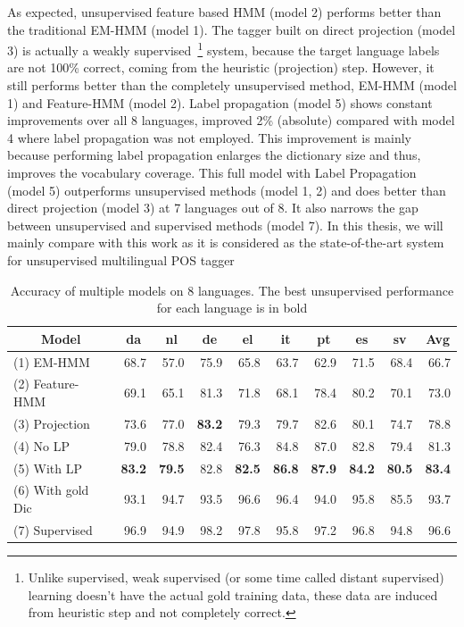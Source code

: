 As expected, unsupervised feature based HMM (model 2) performs better than the traditional EM-HMM (model 1). The tagger built on direct projection (model 3) is actually a weakly supervised~\footnote{Unlike supervised, weak supervised (or some time called distant supervised) learning doesn't have the actual gold training data, these data are induced from heuristic step and not completely correct.} system, because the target language labels are not 100\% correct, coming from the heuristic (projection) step. However, it still performs better than the completely unsupervised method, EM-HMM (model 1) and Feature-HMM (model 2). Label propagation (model 5) shows constant improvements over all 8 languages, improved 2\% (absolute) compared with model 4 where label propagation was not employed. This improvement is mainly because performing label propagation enlarges the dictionary size and thus, improves the vocabulary coverage. This full model with Label Propagation (model 5) outperforms unsupervised methods (model 1, 2) and does better than direct projection (model 3) at 7 languages out of 8. It also narrows the gap between unsupervised and supervised methods (model 7). In this thesis, we will mainly compare with this work as it is considered as the state-of-the-art system for unsupervised multilingual POS tagger

\begin{table}[htbp]
  \centering

    \begin{tabular}{l|rrrrrrrr|r}
    \multicolumn{1}{c}{Model} & \multicolumn{1}{c}{da} & \multicolumn{1}{c}{nl} & \multicolumn{1}{c}{de} & \multicolumn{1}{c}{el} & \multicolumn{1}{c}{it} & \multicolumn{1}{c}{pt} & \multicolumn{1}{c}{es} & \multicolumn{1}{c}{sv} & \multicolumn{1}{c}{Avg} \\\hline

    (1) EM-HMM & 68.7  & 57.0    & 75.9  & 65.8  & 63.7  & 62.9  & 71.5  & 68.4  & 66.7 \\
    (2) Feature-HMM & 69.1  & 65.1  & 81.3  & 71.8  & 68.1  & 78.4  & 80.2  & 70.1  & 73.0 \\
    (3) Projection & 73.6  & 77.0    & \textbf{83.2}  & 79.3  & 79.7  & 82.6  & 80.1  & 74.7  & 78.8 \\\hline
    (4) No LP  & 79.0    & 78.8  & 82.4  & 76.3  & 84.8  & 87.0    & 82.8  & 79.4  & 81.3 \\
    (5) With LP & \textbf{83.2}  &\textbf{ 79.5}  & 82.8  & \textbf{82.5}  & \textbf{86.8}  & \textbf{87.9}  & \textbf{84.2 } &\textbf{ 80.5 } & \textbf{83.4 }\\\hline
    (6) With gold Dic & 93.1  & 94.7  & 93.5  & 96.6  & 96.4  & 94.0    & 95.8  & 85.5  & 93.7 \\
    (7) Supervised & 96.9  & 94.9  & 98.2  & 97.8  & 95.8  & 97.2  & 96.8  & 94.8  & 96.6 \\
    \end{tabular}%
    \caption{Accuracy of multiple models on 8 languages. The best unsupervised performance for each language is in bold}
  \label{tab:dasTable}%
\end{table}%


